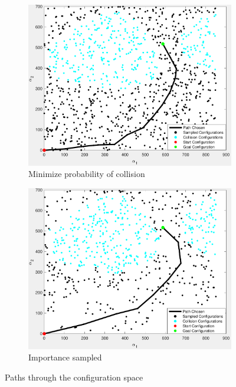 \documentclass[letterpaper, 10 pt, conference]{ieeeconf}  %
\begin{document}
\begin{figure}[htpb]
        \begin{subfigure}[b]{1.4in} 
                \centering
                \includegraphics[width=\textwidth]{figures/path/path3.pdf}
                \caption{Minimize probability of collision}
                \label{fig:path3}
        \end{subfigure}
        \begin{subfigure}[b]{1.4in}                            
                \centering
                \includegraphics[width=\textwidth]{figures/path/path4.pdf}
                \caption{Importance sampled}
                \label{fig:path4}
        \end{subfigure}
        \caption{Paths through the configuration space}
        \label{fig:path}
\end{figure}
\end{document}
